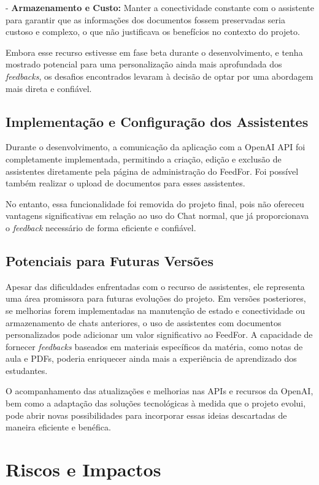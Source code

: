 - \textbf{Armazenamento e Custo:} Manter a conectividade constante com o assistente para garantir que as informações dos documentos fossem preservadas seria custoso e complexo, o que não justificava os benefícios no contexto do projeto.

Embora esse recurso estivesse em fase beta durante o desenvolvimento, e tenha mostrado potencial para uma personalização ainda mais aprofundada dos \textit{feedbacks}, os desafios encontrados levaram à decisão de optar por uma abordagem mais direta e confiável.

\subsection{Implementação e Configuração dos Assistentes}

Durante o desenvolvimento, a comunicação da aplicação com a OpenAI API foi completamente implementada, permitindo a criação, edição e exclusão de assistentes diretamente pela página de administração do FeedFor. Foi possível também realizar o upload de documentos para esses assistentes.

No entanto, essa funcionalidade foi removida do projeto final, pois não ofereceu vantagens significativas em relação ao uso do Chat normal, que já proporcionava o \textit{feedback} necessário de forma eficiente e confiável.

\subsection{Potenciais para Futuras Versões}

Apesar das dificuldades enfrentadas com o recurso de assistentes, ele representa uma área promissora para futuras evoluções do projeto. Em versões posteriores, se melhorias forem implementadas na manutenção de estado e conectividade ou armazenamento de chats anteriores, o uso de assistentes com documentos personalizados pode adicionar um valor significativo ao FeedFor. A capacidade de fornecer \textit{feedbacks} baseados em materiais específicos da matéria, como notas de aula e PDFs, poderia enriquecer ainda mais a experiência de aprendizado dos estudantes.

O acompanhamento das atualizações e melhorias nas APIs e recursos da OpenAI, bem como a adaptação das soluções tecnológicas à medida que o projeto evolui, pode abrir novas possibilidades para incorporar essas ideias descartadas de maneira eficiente e benéfica.

\section{Riscos e Impactos}

